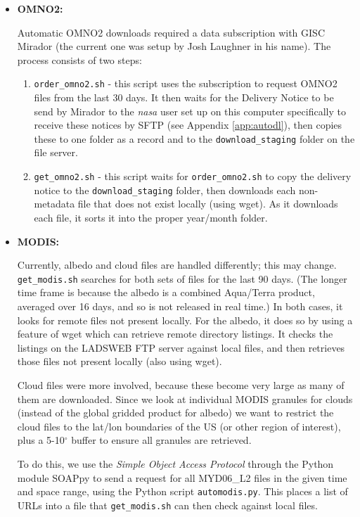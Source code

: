 \documentclass[12pt]{article}
\begin{document}
		\begin{itemize}
			\item \textbf{OMNO2:}
			
			Automatic OMNO2 downloads required a data subscription with GISC Mirador (the current one was setup by Josh Laughner in his name). The process consists of two steps:
			\begin{enumerate} [noitemsep]
				\item \texttt{order\_omno2.sh} - this script uses the subscription to request OMNO2 files from the last 30 days. It then waits for the Delivery Notice to be send by Mirador to the \emph{nasa} user set up on this computer specifically to receive these notices by SFTP (see Appendix \ref{app:autodl}), then copies these to one folder as a record and to the \texttt{download\_staging} folder on the file server.
				
				\item \texttt{get\_omno2.sh} - this script waits for \texttt{order\_omno2.sh} to copy the delivery notice to the \texttt{download\_staging} folder, then downloads each non-metadata file that does not exist locally (using wget). As it downloads each file, it sorts it into the proper year/month folder.
			\end{enumerate}
			
			\item \textbf{MODIS:}
			
			Currently, albedo and cloud files are handled differently; this may change. \texttt{get\_modis.sh} searches for both sets of files for the last 90 days. (The longer time frame is because the albedo is a combined Aqua/Terra product, averaged over 16 days, and so is not released in real time.) In both cases, it looks for remote files not present locally. For the albedo, it does so by using a feature of wget which can retrieve remote directory listings. It checks the listings on the LADSWEB FTP server against local files, and then retrieves those files not present locally (also using wget).
			
			Cloud files were more involved, because these become very large as many of them are downloaded. Since we look at individual MODIS granules for clouds (instead of the global gridded product for albedo) we want to restrict the cloud files to the lat/lon boundaries of the US (or other region of interest), plus a 5-10$^\circ$ buffer to ensure all granules are retrieved.
			
			To do this, we use the \emph{Simple Object Access Protocol} through the Python module SOAPpy to send a request for all MYD06\_L2 files in the given time and space range, using the Python script \texttt{automodis.py}. This places a list of URLs into a file that \texttt{get\_modis.sh} can then check against local files. 
			

\end{itemize}
\end{document}
